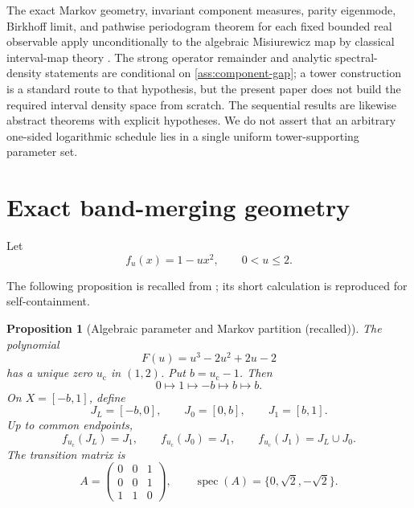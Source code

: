 \documentclass[11pt]{article}
\newtheorem{proposition}[theorem]{Proposition}
\theoremstyle{definition}
\theoremstyle{remark}
\newcommand{\uc}{u_{\mathrm c}}
\newcommand{\spec}{\operatorname{spec}}
\begin{document}
The exact Markov geometry, invariant component measures, parity eigenmode, Birkhoff limit, and pathwise periodogram theorem for each fixed bounded real observable apply unconditionally to the algebraic Misiurewicz map by classical interval-map theory \citep{Misiurewicz1981,Young1992,deMeloVanStrien1993,Baladi2000}.  The strong operator remainder and analytic spectral-density statements are conditional on \cref{ass:component-gap}; a tower construction is a standard route to that hypothesis, but the present paper does not build the required interval density space from scratch.  The sequential results are likewise abstract theorems with explicit hypotheses.  We do not assert that an arbitrary one-sided logarithmic schedule lies in a single uniform tower-supporting parameter set.

\section{Exact band-merging geometry}

Let
\begin{equation}\label{eq:quadratic-family}
    f_u(x)=1-u x^2,
    \qquad 0<u\le2.
\end{equation}

The following proposition is recalled from \citet{WangReformulation2026}; its short calculation is reproduced for self-containment.

\begin{proposition}[Algebraic parameter and Markov partition (recalled)]\label{prop:geometry}
The polynomial
\begin{equation}\label{eq:uc-polynomial}
    F(u)=u^3-2u^2+2u-2
\end{equation}
has a unique zero $\uc$ in $(1,2)$.  Put $b=\uc-1$.  Then
\begin{equation}\label{eq:critical-orbit}
    0\longmapsto1\longmapsto-b\longmapsto b\longmapsto b.
\end{equation}
On $X=[-b,1]$, define
\[
    J_L=[-b,0],\qquad J_0=[0,b],\qquad J_1=[b,1].
\]
Up to common endpoints,
\begin{equation}\label{eq:markov-images}
    f_{\uc}(J_L)=J_1,
    \qquad f_{\uc}(J_0)=J_1,
    \qquad f_{\uc}(J_1)=J_L\cup J_0.
\end{equation}
The transition matrix is
\begin{equation}\label{eq:markov-matrix}
    A=
    \begin{pmatrix}
        0&0&1\\
        0&0&1\\
        1&1&0
    \end{pmatrix},
    \qquad \spec(A)=\{0,\sqrt2,-\sqrt2\}.
\end{equation}
\end{proposition}
\end{document}
